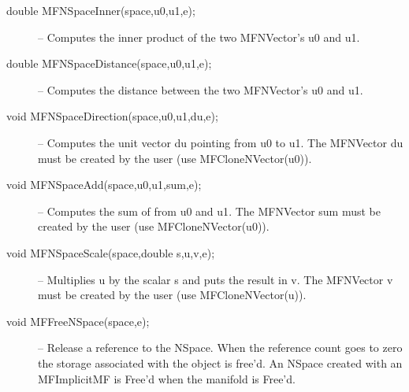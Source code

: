 \documentclass[12pt]{article}
\begin{document}
\begin{description}
\item [double MFNSpaceInner(space,u0,u1,e);]
  -- Computes the inner product of the two MFNVector's {u0} and {u1}.
\item [double MFNSpaceDistance(space,u0,u1,e);]
  -- Computes the distance between the two MFNVector's {u0} and {u1}.
\item [void MFNSpaceDirection(space,u0,u1,du,e);]
  -- Computes the unit vector {du} pointing from {u0} to {u1}.
     The MFNVector {du} must be created by the user (use MFCloneNVector(u0)).
\item [void MFNSpaceAdd(space,u0,u1,sum,e);]
  -- Computes the sum of from {u0} and {u1}.
     The MFNVector {sum} must be created by the user (use MFCloneNVector(u0)).
\item [void MFNSpaceScale(space,double s,u,v,e);]
  -- Multiplies {u} by the scalar {s} and puts the result in {v}.
     The MFNVector {v} must be created by the user (use MFCloneNVector(u)).
\item [void MFFreeNSpace(space,e);]
-- Release a reference to the NSpace. When the reference count goes to zero the
   storage associated with the object is free'd. An NSpace created with an
   MFImplicitMF is Free'd when the manifold is Free'd.
\end{description}
\end{document}
